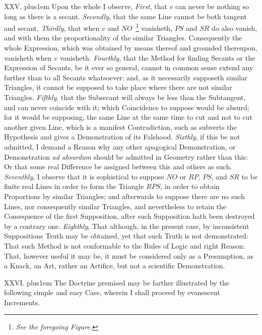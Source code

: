 
\medbreak

XXV. \hskip 0pt plus1em
Upon the whole I observe, {\it First}, that $v$ can never be
nothing so long as there is a secant.  {\it Secondly}, that the
same Line cannot be both tangent and secant.  {\it Thirdly}, that
when $v$ and $NO$~\footnote*{{\it See the foregoing Figure.}}
vanisheth, $PS$ and $SR$ do also vanish, and with them the
proportionality of the similar Triangles.  Consequently the whole
Expression, which was obtained by means thereof and grounded
thereupon, vanisheth when $v$ vanisheth.  {\it Fourthly}, that
the Method for finding Secants or the Expression of Secants, be
it ever so general, cannot in common sense extend any further
than to all Secants whatsoever: and, as it necessarily supposeth
similar Triangles, it cannot be supposed to take place where
there are not similar Triangles.  {\it Fifthly}, that the
Subsecant will always be less than the Subtangent, and can never
coincide with it; which Coincidence to suppose would be absurd;
for it would be supposing, the same Line at the same time to cut
and not to cut another given Line, which is a manifest
Contradiction, such as subverts the Hypothesis and gives a
Demonstration of its Falshood.  {\it Sixthly}, if this be not
admitted, I demand a Reason why any other apagogical
Demonstration, or Demonstration {\it ad absurdum\/} should be
admitted in Geometry rather than this: Or that some real
Difference be assigned between this and others as such.
{\it Seventhly}, I observe that it is sophistical to suppose $NO$
or $RP$, $PS$, and $SR$ to be finite real Lines in order to form
the Triangle $RPS$, in order to obtain Proportions by similar
Triangles; and afterwards to suppose there are no such Lines, nor
consequently similar Triangles, and nevertheless to retain the
Consequence of the first Supposition, after such Supposition hath
been destroyed by a contrary one.  {\it Eighthly}, That although,
in the present case, by inconsistent Suppositions Truth may be
obtained, yet that such Truth is not demonstrated: That such
Method is not conformable to the Rules of Logic and right Reason:
That, however useful it may be, it must be considered only as a
Presumption, as a Knack, an Art, rather an Artifice, but not a
scientific Demonstration.

\medbreak

XXVI. \hskip 0pt plus1em
The Doctrine premised may be farther illustrated by the following
simple and easy Case, wherein I shall proceed by evanescent
Increments.

